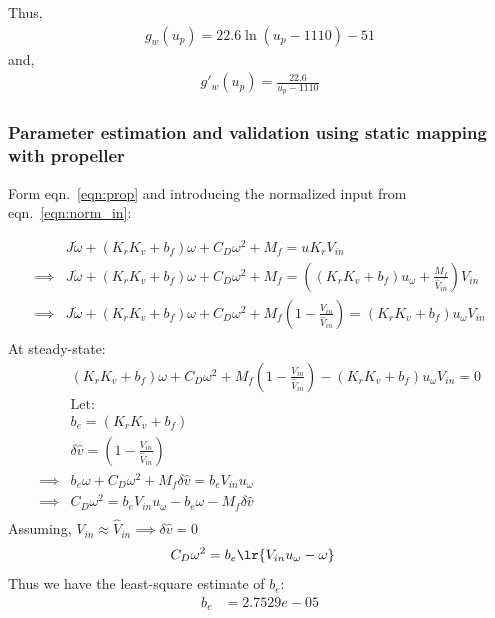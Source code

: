 Thus,
\begin{align*}
    \boxed{g_w(u_p) = 22.6 \ln(u_p - 1110)- 51 }
\end{align*}
and,
\begin{align*}
    g'_w(u_p) = \frac{22.6}{u_p - 1110}
\end{align*}


\subsubsection{Parameter estimation and validation using static mapping with propeller}
Form eqn.~\ref{eqn:prop} and introducing the normalized input from eqn.~\ref{eqn:norm_in}:

\begin{align*}
    & J\dot \omega + (K_rK_v + b_f) \omega + C_D \omega^2 + M_f = u K_r V_{in}\\
    \implies & J\dot \omega + (K_rK_v + b_f) \omega + C_D \omega^2 + M_f = \left( (K_r K_v  + b_f) u_\omega + \frac{M_f}{\hat V_{in}} \right) V_{in}\\
    \implies & J\dot \omega + (K_rK_v + b_f) \omega + C_D \omega^2 + M_f \left(1 - \frac{V_{in}}{\hat V_{in}} \right) = (K_r K_v  + b_f) u_\omega V_{in}\\
\end{align*}
At steady-state:
\begin{align*}
    & (K_rK_v + b_f) \omega + C_D \omega^2 + M_f \left(1 - \frac{V_{in}}{\hat V_{in}} \right) - (K_r K_v  + b_f) u_\omega V_{in} = 0\\
    & \text{Let:}\\
    & b_e = (K_r K_v  + b_f) \\
    & \delta \hat v = \left(1 - \frac{V_{in}}{\hat V_{in}} \right)\\
    \implies &  b_e \omega + C_D \omega^2 + M_f \delta \hat v = b_e V_{in} u_\omega\\
    \implies & C_D \omega^2 = b_e V_{in} u_\omega - b_e \omega - M_f \delta \hat v\\
\end{align*}
Assuming, $V_{in} \approx \hat V_{in} \implies \delta \hat v = 0$
\begin{align*}
    C_D \omega^2 &= b_e \lr{ V_{in} u_\omega - \omega}
\end{align*}
Thus we have the least-square estimate of $b_e$:
\begin{align*}
    b_e &= 2.7529e-05
\end{align*}
